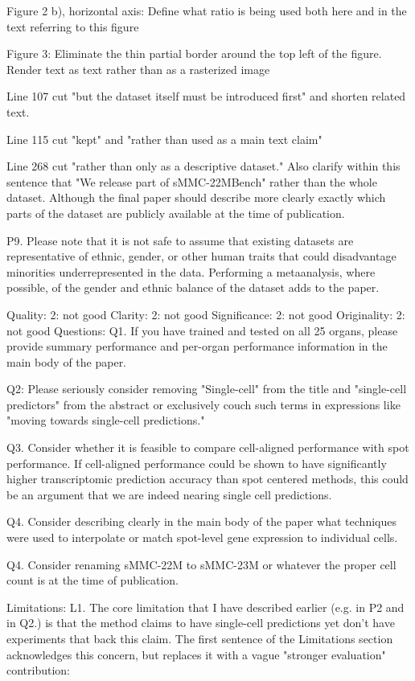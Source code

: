 Figure 2 b), horizontal axis: Define what ratio is being used both here and in the text referring to this figure

Figure 3: Eliminate the thin partial border around the top left of the figure. Render text as text rather than as a rasterized image

Line 107 cut "but the dataset itself must be introduced first" and shorten related text.

Line 115 cut "kept" and "rather than used as a main text claim"

Line 268 cut "rather than only as a descriptive dataset." Also clarify within this sentence that "We release part of sMMC-22MBench" rather than the whole dataset. Although the final paper should describe more clearly exactly which parts of the dataset are publicly available at the time of publication.

P9. Please note that it is not safe to assume that existing datasets are representative of ethnic, gender, or other human traits that could disadvantage minorities underrepresented in the data. Performing a metaanalysis, where possible, of the gender and ethnic balance of the dataset adds to the paper.

Quality: 2: not good
Clarity: 2: not good
Significance: 2: not good
Originality: 2: not good
Questions:
Q1. If you have trained and tested on all 25 organs, please provide summary performance and per-organ performance information in the main body of the paper.

Q2: Please seriously consider removing "Single-cell" from the title and "single-cell predictors" from the abstract or exclusively couch such terms in expressions like "moving towards single-cell predictions."

Q3. Consider whether it is feasible to compare cell-aligned performance with spot performance. If cell-aligned performance could be shown to have significantly higher transcriptomic prediction accuracy than spot centered methods, this could be an argument that we are indeed nearing single cell predictions.

Q4. Consider describing clearly in the main body of the paper what techniques were used to interpolate or match spot-level gene expression to individual cells.

Q4. Consider renaming sMMC-22M to sMMC-23M or whatever the proper cell count is at the time of publication.

Limitations:
L1. The core limitation that I have described earlier (e.g. in P2 and in Q2.) is that the method claims to have single-cell predictions yet don't have experiments that back this claim. The first sentence of the Limitations section acknowledges this concern, but replaces it with a vague "stronger evaluation" contribution:

